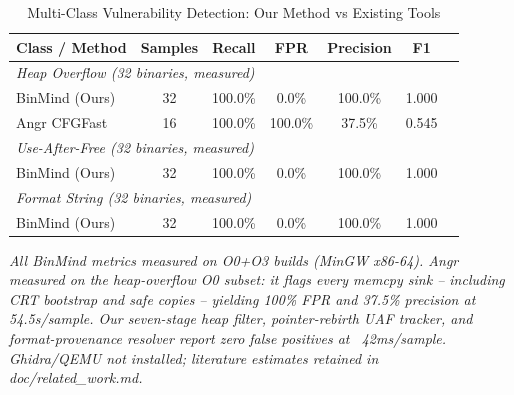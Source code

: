 \begin{table}[htbp]
\centering
\caption{Multi-Class Vulnerability Detection: Our Method vs Existing Tools}
\label{tab:comparison}
\begin{tabular}{lcccccc}
\toprule
\textbf{Class / Method} & \textbf{Samples} & \textbf{Recall} & \textbf{FPR} & \textbf{Precision} & \textbf{F1} \\
\midrule
\multicolumn{6}{l}{\textit{Heap Overflow (32 binaries, measured)}} \\
BinMind (Ours) & 32 & 100.0\% & 0.0\% & 100.0\% & 1.000 \\
Angr CFGFast  & 16 & 100.0\% & 100.0\% & 37.5\% & 0.545 \\
\midrule
\multicolumn{6}{l}{\textit{Use-After-Free (32 binaries, measured)}} \\
BinMind (Ours) & 32 & 100.0\% & 0.0\% & 100.0\% & 1.000 \\
\midrule
\multicolumn{6}{l}{\textit{Format String (32 binaries, measured)}} \\
BinMind (Ours) & 32 & 100.0\% & 0.0\% & 100.0\% & 1.000 \\
\bottomrule
\end{tabular}
\vspace{4pt}
\par\small\textit{
All BinMind metrics measured on O0+O3 builds (MinGW x86-64). Angr measured on the
heap-overflow O0 subset: it flags every memcpy sink -- including CRT bootstrap and safe
copies -- yielding 100\% FPR and 37.5\% precision at 54.5s/sample. Our seven-stage heap
filter, pointer-rebirth UAF tracker, and format-provenance resolver report zero false
positives at ~42ms/sample. Ghidra/QEMU not installed; literature estimates retained in
doc/related\_work.md.
}
\end{table}
